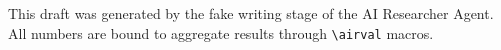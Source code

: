 This draft was generated by the fake writing stage of the AI Researcher Agent. All numbers are bound to aggregate results through \texttt{\textbackslash airval} macros.
